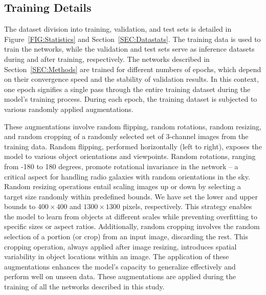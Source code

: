 \documentclass[
  journal=pasa,
  manuscript=research-paper, %
  year=2020,
  volume=37,
]{cup-journal}
\begin{document}
\subsection{Training Details}
The dataset division into training, validation, and test sets is detailed in Figure~\ref{FIG:Statistics} and Section~\ref{SEC:Datastats}.
The training data is used to train the networks, while the validation and test sets serve as inference datasets during and after training, respectively.
The networks described in Section~\ref{SEC:Methods} are trained for different numbers of epochs, which depend on their convergence speed and the stability of validation results. In this context, one epoch signifies a single pass through the entire training dataset during the model's training process.
During each epoch, the training dataset is subjected to various randomly applied augmentations.

These augmentations involve random flipping, random rotations, random resizing, and random cropping of a randomly selected set of 3-channel images from the training data.
Random flipping, performed horizontally (left to right), exposes the model to various object orientations and viewpoints. Random rotations, ranging from -180 to 180 degrees, promote rotational invariance in the network -- a critical aspect for handling radio galaxies with random orientations in the sky.
Random resizing operations entail scaling images up or down by selecting a target size randomly within predefined bounds. We have set the lower and upper bounds to $400\times400$ and $1300\times1300$ pixels, respectively. This strategy enables the model to learn from objects at different scales while preventing overfitting to specific sizes or aspect ratios.
Additionally, random cropping involves the random selection of a portion (or crop) from an input image, discarding the rest. This cropping operation, always applied after image resizing, introduces spatial variability in object locations within an image.
The application of these augmentations enhances the model's capacity to generalize effectively and perform well on unseen data.
These augmentations are applied during the training of all the networks described in this study.
\end{document}
